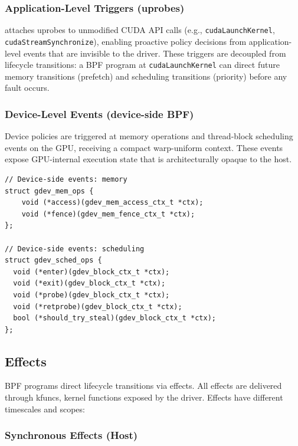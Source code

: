 \subsubsection{Application-Level Triggers (uprobes)}

\sys attaches uprobes to unmodified CUDA API calls (e.g., \texttt{cudaLaunchKernel}, \texttt{cudaStreamSynchronize}), enabling proactive policy decisions from application-level events that are invisible to the driver. These triggers are decoupled from lifecycle transitions: a BPF program at \texttt{cudaLaunchKernel} can direct future memory transitions (prefetch) and scheduling transitions (priority) before any fault occurs.

\subsubsection{Device-Level Events (device-side BPF)}

Device policies are triggered at memory operations and thread-block scheduling events on the GPU, receiving a compact warp-uniform context. These events expose GPU-internal execution state that is architecturally opaque to the host.

\begin{lstlisting}
// Device-side events: memory
struct gdev_mem_ops {
    void (*access)(gdev_mem_access_ctx_t *ctx);
    void (*fence)(gdev_mem_fence_ctx_t *ctx);
};

// Device-side events: scheduling
struct gdev_sched_ops {
  void (*enter)(gdev_block_ctx_t *ctx);
  void (*exit)(gdev_block_ctx_t *ctx);
  void (*probe)(gdev_block_ctx_t *ctx);
  void (*retprobe)(gdev_block_ctx_t *ctx);
  bool (*should_try_steal)(gdev_block_ctx_t *ctx);
};
\end{lstlisting}


\subsection{Effects}
\label{sec:design-effects}

BPF programs direct lifecycle transitions via effects. All effects are delivered through kfuncs, kernel functions exposed by the driver. Effects have different timescales and scopes:

\subsubsection{Synchronous Effects (Host)}

